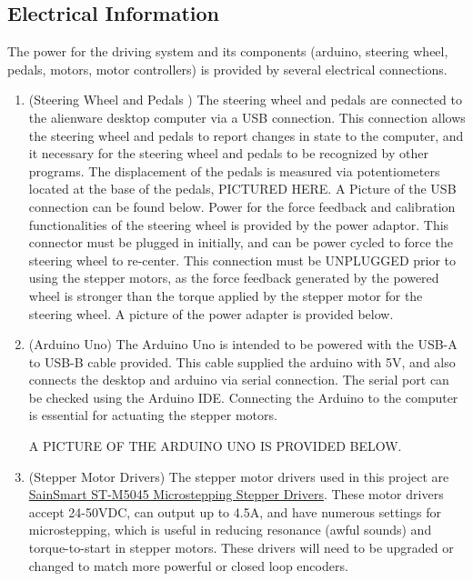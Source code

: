 \documentclass{article}
\begin{document}
\subsection{Electrical Information}
The power for the driving system and its components (arduino, steering wheel, pedals, motors, motor controllers) is provided by several electrical connections.
\begin{enumerate}

\item(Steering Wheel and Pedals ) The steering wheel and pedals are connected to the alienware desktop computer via a USB connection. This connection allows the steering wheel and pedals to report changes in state to the computer, and it necessary for the steering wheel and pedals to be recognized by other programs. The displacement of the pedals is measured via potentiometers located at the base of the pedals, PICTURED HERE. A Picture of the USB connection can be found below. Power for the force feedback and calibration functionalities of the steering wheel is provided by the power adaptor. This connector must be plugged in initially, and can be power cycled to force the steering wheel to re-center. This connection must be UNPLUGGED prior to using the stepper motors, as the force feedback generated by the powered wheel is stronger than the torque applied by the stepper motor for the steering wheel. A picture of the power adapter is provided below.

\item(Arduino Uno) The Arduino Uno is intended to be powered with the USB-A to USB-B cable provided. This cable supplied the arduino with 5V, and also connects the desktop and arduino via serial connection. The serial port can be checked using the Arduino IDE. Connecting the Arduino to the computer is essential for actuating the stepper motors.

A PICTURE OF THE ARDUINO UNO IS PROVIDED BELOW.

\item(Stepper Motor Drivers) The stepper motor drivers used in this project are \href{https://www.amazon.com/SainSmart-Micro-Stepping-Stepper-Driver-ST-M5045/dp/B00DFSF9GE/ref=cm_cr_arp_d_product_top?ie=UTF8}{SainSmart ST-M5045 Microstepping Stepper Drivers}. These motor drivers accept 24-50VDC, can output up to 4.5A, and have numerous settings for microstepping, which is useful in reducing resonance (awful sounds) and torque-to-start in stepper motors. These drivers will need to be upgraded or changed to match more powerful or closed loop encoders.


\end{enumerate}
\end{document}
